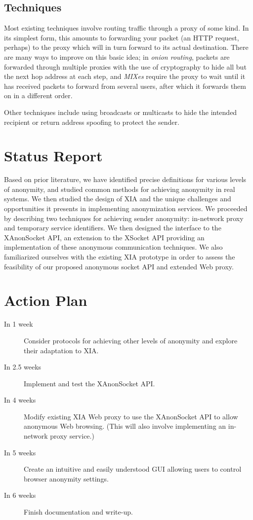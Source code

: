 \documentclass[11pt]{article}
\begin{document}
\subsection{Techniques}
Most existing techniques involve routing traffic through a proxy of some kind. In its simplest form, this amounts to forwarding your packet (an HTTP request, perhaps) to the proxy which will in turn forward to its actual destination. There are many ways to improve on this basic idea; in \emph{onion routing}, packets are forwarded through multiple proxies with the use of cryptography to hide all but the next hop address at each step, and \emph{MIXes} \cite{Chaum81} require the proxy to wait until it has received packets to forward from several users, after which it forwards them on in a different order.

Other techniques include using broadcasts or multicasts to hide the intended recipient or return address spoofing to protect the sender.


\section{Status Report}
Based on prior literature, we have identified precise definitions for various levels of anonymity, and studied common methods for achieving anonymity in real systems.  We then studied the design of XIA and the unique challenges and opportunities it presents in implementing anonymization services.  We proceeded by describing two techniques for achieving sender anonymity: in-network proxy and temporary service identifiers. We then designed the interface to the XAnonSocket API, an extension to the XSocket API providing an implementation of these anonymous communication techniques. We also familiarized ourselves with the existing XIA prototype in order to assess the feasibility of our proposed anonymous socket API and extended Web proxy.

\section{Action Plan}
\begin{description}
\item[In 1 week] Consider protocols for achieving other levels of anonymity and explore their adaptation to XIA.
\item[In 2.5 weeks] Implement and test the XAnonSocket API.
\item[In 4 weeks] Modify existing XIA Web proxy to use the XAnonSocket API to allow anonymous Web browsing. (This will also involve implementing an in-network proxy service.)
\item[In 5 weeks] Create an intuitive and easily understood GUI allowing users to control browser anonymity settings.
\item[In 6 weeks] Finish documentation and write-up.
\end{description}
\end{document}
